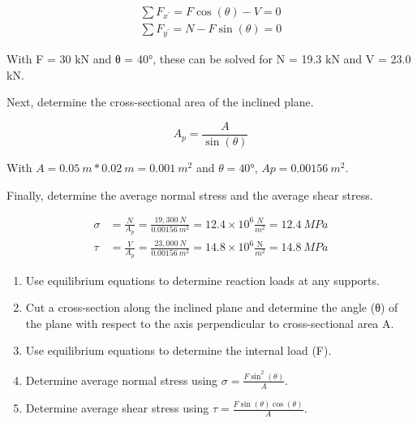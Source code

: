 \documentclass[
  letterpaper,
  DIV=11,
  numbers=noendperiod]{scrreprt}
\begin{document}
\begin{tcolorbox}
\begin{tcolorbox}
\[
\begin{aligned}
\sum F_{x^{\prime}}= F \cos (\theta)-V=0 \\
\sum F_{y^{\prime}}= N-F \sin (\theta)=0
\end{aligned}
\]

With F = 30 kN and θ = 40°, these can be solved for N = 19.3 kN and V =
23.0 kN.

Next, determine the cross-sectional area of the inclined plane.

\[
A_p=\frac{A}{\sin (\theta)}
\]

With \(A = 0.05{~m}*0.02{~m} = 0.001{~m}^2\) and \(θ = 40°\),
\(Ap = 0.00156{~m}^2\).

Finally, determine the average normal stress and the average shear
stress.

\[
\begin{aligned}
\sigma & =\frac{N}{A_p}=\frac{19,300{~N}}{0.00156{~m}^2}=12.4 \times 10^6 \frac{{N}}{m^2}=12.4{~MPa} \\
\tau & =\frac{V}{A_p}=\frac{23,000{~N}}{0.00156{~m}^2}=14.8 \times 10^6 \frac{\mathrm{N}}{m^2}=14.8{~MPa}
\end{aligned}
\]

\end{tcolorbox}

\end{tcolorbox}

\begin{tcolorbox}[enhanced jigsaw, breakable, opacityback=0, toptitle=1mm, left=2mm, colback=white, opacitybacktitle=0.6, colframe=quarto-callout-warning-color-frame, titlerule=0mm, arc=.35mm, leftrule=.75mm, bottomtitle=1mm, colbacktitle=quarto-callout-warning-color!10!white, rightrule=.15mm, title={Step-by-step: Stresses on Inclined Planes}, bottomrule=.15mm, toprule=.15mm, coltitle=black]

\begin{enumerate}
\def\labelenumi{\arabic{enumi}.}
\item
  Use equilibrium equations to determine reaction loads at any supports.
\item
  Cut a cross-section along the inclined plane and determine the angle
  (θ) of the plane with respect to the axis perpendicular to
  cross-sectional area A.
\item
  Use equilibrium equations to determine the internal load (F).
\item
  Determine average normal stress using
  \(\sigma=\frac{F \sin ^2(\theta)}{A}\).
\item
  Determine average shear stress using
  \(\tau=\frac{F \sin (\theta) \cos (\theta)}{A}\).
\end{enumerate}

\end{tcolorbox}
\end{document}
